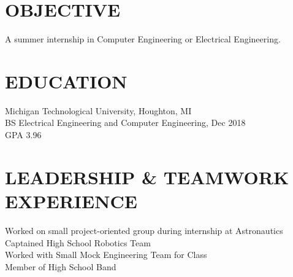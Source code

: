 \documentclass[letterpaper]{res}
\begin{document}
 


\address{\bf  PRESENT ADDRESS \\ 51280 Blue Top Cabin Rd \\ Houghton, MI 49931}
\address{\\ jaevanko@mtu.edu \\ (269) 262-6098}
\address{\bf PERMANENT ADDRESS \\ 14200 Stone Jug Road \\  Battle Creek, MI 49015}

\begin{resume}

  \section{OBJECTIVE}          
  A summer internship in Computer Engineering or Electrical Engineering.          

  \section{EDUCATION}          
  Michigan Technological University, Houghton, MI  \\        
  BS Electrical Engineering and Computer Engineering, Dec 2018   \\      
  GPA 3.96

  \section{LEADERSHIP \& TEAMWORK EXPERIENCE}
  Worked on small project-oriented group during internship at Astronautics \\
  Captained High School Robotics Team \\
  Worked with Small Mock Engineering Team for Class \\
  Member of High School Band



\end{resume}
\end{document}
